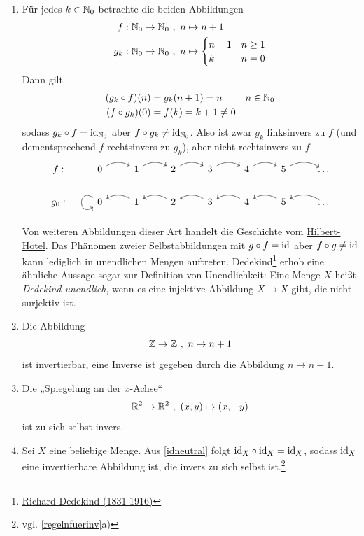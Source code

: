 \begin{bsp} \label{bsp:umkehrabb} \qquad
    \begin{enumerate}
        \item Für jedes $k\in \mathbb N_0$ betrachte die beiden Abbildungen
        \begin{align*}
            f:\mathbb N_0 \to \mathbb N_0 \ &,\ n \mapsto n+1 \\
            g_k: \mathbb N_0 \to \mathbb N_0\ &,\ n \mapsto \begin{cases}
                n-1 & n\ge 1 \\
                k & n=0
            \end{cases}
        \end{align*}
        Dann gilt
        \begin{align*}
            (g_k\circ f)(n)&=g_k(n+1)=n && n\in \mathbb N_0 \\
            (f\circ g_k)(0) & = f(k) = k+1 \neq 0
        \end{align*}
        sodass $g_k\circ f=\mathrm{id}_{\mathbb N_0}$ aber $f\circ g_k\neq \mathrm{id}_{\mathbb N_0}$. Also ist zwar $g_k$ linksinvers zu $f$ (und dementsprechend $f$ rechtsinvers zu $g_k$), aber nicht rechtsinvers zu $f$.
        \[\begin{tikzcd}
            f\vcentcolon & 0 \ar[r, bend left]& 1 \ar[r, bend left]& 2 \ar[r, bend left]& 3 \ar[r, bend left]& 4 \ar[r, bend left]& 5 \ar[r, bend left]& \dots \\
            g_0\vcentcolon & 0 \ar[loop, out=145, in=215, looseness=5] & 1 \ar[l, bend right] & 2 \ar[l, bend right] & 3 \ar[l, bend right] & 4  \ar[l, bend right] & 5  \ar[l, bend right] &  \ar[l, bend right]  \dots
        \end{tikzcd}\]
        Von weiteren Abbildungen dieser Art handelt die Geschichte vom \href{https://en.wikipedia.org/wiki/Hilbert\%27s_paradox_of_the_Grand_Hotel}{Hilbert-Hotel}. Das Phänomen zweier Selbstabbildungen mit $g\circ f=\mathrm{id}$ aber $f\circ g\neq \mathrm{id}$ kann lediglich in unendlichen Mengen auftreten. Dedekind\footnote{\href{https://de.wikipedia.org/wiki/Richard_Dedekind}{Richard Dedekind (1831-1916)}} erhob eine ähnliche Aussage sogar zur Definition von Unendlichkeit: Eine Menge $X$ heißt \emph{Dedekind-unendlich}, wenn es eine injektive Abbildung $X\to X$ gibt, die nicht surjektiv ist.
        \item Die Abbildung
            \[ \mathbb Z\to \mathbb Z \ ,\ n\mapsto n+1 \]
        ist invertierbar, eine Inverse ist gegeben durch die Abbildung $n\mapsto n-1$.
        \item Die „Spiegelung an der $x$-Achse“
        \[ \mathbb R^2 \to \mathbb R^2 \ ,\ (x,y) \mapsto (x,-y) \]
        ist zu sich selbst invers.
        \item Sei $X$ eine beliebige Menge. Aus \cref{idneutral} folgt $\mathrm{id}_X\circ \mathrm{id}_X=\mathrm{id}_X$, sodass $\mathrm{id}_X$ eine invertierbare Abbildung ist, die invers zu sich selbst ist.\footnote{vgl. \cref{regelnfuerinv}a)}
    \end{enumerate}
\end{bsp}


